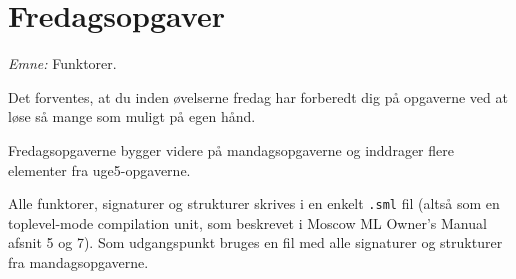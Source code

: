 \documentclass[a4paper,12pt]{article}
\begin{document}
\newpage
\section{Fredagsopgaver}
\label{sec:fredagsopgaver}
\textit{Emne:} Funktorer.

Det forventes, at du inden øvelserne fredag har forberedt dig på
opgaverne ved at løse så mange som muligt på egen hånd.

\vspace{1ex}

Fredagsopgaverne bygger videre på mandagsopgaverne og inddrager flere
elementer fra uge5-opgaverne.

Alle funktorer, signaturer og strukturer skrives i en enkelt
\texttt{.sml} fil (altså som en toplevel-mode compilation unit, som
beskrevet i Moscow ML Owner's Manual afsnit 5 og 7).  Som udgangspunkt
bruges en fil med alle signaturer og strukturer fra mandagsopgaverne.
\end{document}
